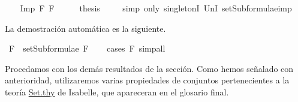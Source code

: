 \begin{isabellebody}
\isamarkupfalse%
\isanewline
\ \ \isamarkupfalse%
\ {\isacharparenleft}Imp\ F{}\ F{}{\isacharparenright}\isanewline
\ \ \isamarkupfalse%
\ \isamarkupfalse%
\ {\isacharquery}thesis\isanewline
\ \ \ \isamarkupfalse%
\ {\isacharparenleft}simp\ only{\isacharcolon}\ singletonI\ UnI{}\ setSubformulae{\isacharunderscore}imp{\isacharparenright}\isanewline
{}\isamarkupfalse%
%
\endisatagproof
{\isafoldproof}%
%
\isadelimproof
%
\endisadelimproof
%
\begin{isamarkuptext}%
La demostración automática es la siguiente.%
\end{isamarkuptext}\isamarkuptrue%
\isamarkupfalse%
\ {\isachardoublequoteopen}F\ {\isasymin}\ setSubformulae\ F{\isachardoublequoteclose}\isanewline
%
\isadelimproof
\ \ %
\endisadelimproof
%
\isatagproof
{}\isamarkupfalse%
\ {\isacharparenleft}cases\ F{\isacharparenright}\ simp{\isacharunderscore}all%
\endisatagproof
{\isafoldproof}%
%
\isadelimproof
%
\endisadelimproof
%
\begin{isamarkuptext}%
Procedamos con los demás resultados de la sección. Como hemos 
  señalado con anterioridad, utilizaremos varias propiedades de 
  conjuntos pertenecientes a la teoría 
  \href{https://n9.cl/qatp}{Set.thy} de Isabelle, que apareceran en 
  el glosario final. 


\end{isamarkuptext}
\end{isabellebody}
